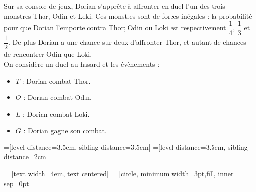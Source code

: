 
\begin{myex}
	
Sur sa console de jeux, Dorian s'apprête à affronter en duel l'un des trois monstres Thor, Odin et Loki. Ces monstres sont de forces inégales : la probabilité pour que Dorian l'emporte contra Thor; Odin ou Loki est respectivement $\dfrac{1}{4}$, $\dfrac{1}{3}$ et $\dfrac{1}{2}$. De plus Dorian a une chance sur deux d'affronter Thor, et autant de chances de rencontrer Odin que Loki.\\

On considère un duel au hasard et les événements :
\begin{itemize}
	\item $T$ : Dorian combat Thor.
	\item $O$ : Dorian combat Odin.
	\item $L$ : Dorian combat Loki.
	\item $G$ : Dorian gagne son combat.
\end{itemize} 


=[level distance=3.5cm, sibling distance=3.5cm]
=[level distance=3.5cm, sibling distance=2cm]

 = [text width=4em, text centered]
 = [circle, minimum width=3pt,fill, inner sep=0pt]


\end{myex}
